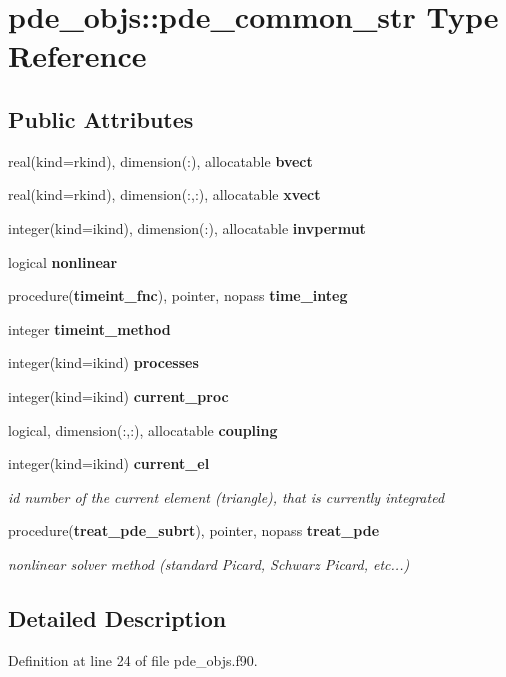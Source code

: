 \section{pde\+\_\+objs\+:\+:pde\+\_\+common\+\_\+str Type Reference}
\label{structpde__objs_1_1pde__common__str}
\subsection*{Public Attributes}
\begin{DoxyCompactItemize}
\item 
real(kind=rkind), dimension(\+:), allocatable {\bf bvect}
\item 
real(kind=rkind), dimension(\+:,\+:), allocatable {\bf xvect}
\item 
integer(kind=ikind), dimension(\+:), allocatable {\bf invpermut}
\item 
logical {\bf nonlinear}
\item 
procedure({\bf timeint\+\_\+fnc}), pointer, nopass {\bf time\+\_\+integ}
\item 
integer {\bf timeint\+\_\+method}
\item 
integer(kind=ikind) {\bf processes}
\item 
integer(kind=ikind) {\bf current\+\_\+proc}
\item 
logical, dimension(\+:,\+:), allocatable {\bf coupling}
\item 
integer(kind=ikind) {\bf current\+\_\+el}
\begin{DoxyCompactList}\small\item\em id number of the current element (triangle), that is currently integrated \end{DoxyCompactList}\item 
procedure({\bf treat\+\_\+pde\+\_\+subrt}), pointer, nopass {\bf treat\+\_\+pde}
\begin{DoxyCompactList}\small\item\em nonlinear solver method (standard Picard, Schwarz Picard, etc...) \end{DoxyCompactList}\end{DoxyCompactItemize}


\subsection{Detailed Description}


Definition at line 24 of file pde\+\_\+objs.\+f90.




